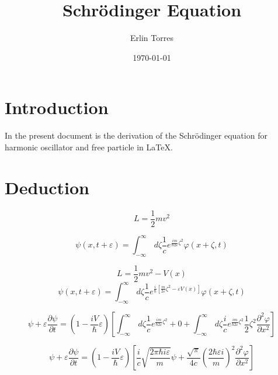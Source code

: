 \documentclass{article}
\title{Schrödinger Equation}
\author{Erlin Torres}
\date{\today}
\begin{document}
\maketitle

\section{Introduction}

In the present document is the derivation of the Schrödinger equation for harmonic oscillator and free particle in \LaTeX.

\section{Deduction}



\begin{equation*}
    L = \frac{1}{2} mv^2
\end{equation*}

\begin{equation}
\psi (x,t+\varepsilon) = \int_{-\infty }^{\infty}  \,d\zeta \frac{1}{c} e^{\frac{im}{\hbar 2\varepsilon }\zeta^2} \varphi (x + \zeta, t)
\end{equation}

\begin{equation*}
    L = \frac{1}{2} mv^2 - V(x)
\end{equation*}
\begin{equation}
\psi (x,t+\varepsilon) = \int_{-\infty }^{\infty}  \,d\zeta \frac{1}{c} e^{\frac{i}{\hbar}[{\frac{m}{ 2\varepsilon }\zeta^2} - \varepsilon V(x)] }\varphi (x + \zeta, t)
\end{equation}

\begin{equation}
    \psi + \varepsilon  \frac{\partial \psi}{\partial t} = (1 - \frac{iV}{\hbar}\varepsilon) [\int_{-\infty }^{\infty}  \,d\zeta \frac{1}{c} e^{\frac{im}{\hbar 2\varepsilon }\zeta^2}  + 0 + \int_{-\infty }^{\infty}  \,d\zeta \frac{i}{c} e^{\frac{im}{\hbar 2\varepsilon }\zeta^2} \frac{1}{2} \zeta^2  \frac{\partial^2 \varphi}{\partial x^2} ]
\end{equation}

\begin{equation}
    \psi + \varepsilon  \frac{\partial \psi}{\partial t} = (1 - \frac{iV}{\hbar}\varepsilon) [\frac{i}{c} \sqrt{\frac{2 \pi \hbar i \varepsilon }{m}}\psi + \frac{\sqrt{\pi}}{4c} (\frac{2 \hbar \varepsilon i}{m})^2 \frac{\partial^2 \varphi}{\partial x^2} ]
\end{equation}
\end{document}
